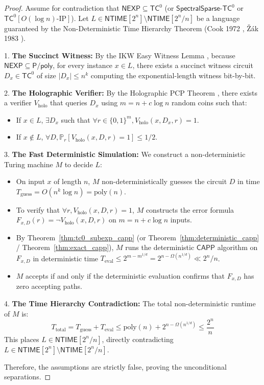 \documentclass[11pt,a4paper]{article}
\theoremstyle{definition}
\theoremstyle{remark}
\newcommand{\Ppoly}{\mathsf{P/poly}}
\newcommand{\NEXP}{\mathsf{NEXP}}
\newcommand{\TC}{\mathsf{TC}}
\newcommand{\NTIME}{\mathsf{NTIME}}
\newcommand{\poly}{\mathrm{poly}}
\newcommand{\CAPP}{\mathsf{CAPP}}
\newcommand{\SparseTC}{\mathsf{SpectralSparse}\text{-}\mathsf{TC}^0}
\begin{document}
\begin{proof}
Assume for contradiction that $\NEXP \subseteq \TC^0$ (or $\SparseTC$ or $\TC^0[O(\log n)\text{-}\mathrm{IP}]$).
Let $L \in \NTIME[2^n] \setminus \NTIME[2^n / n]$ be a language guaranteed by the Non-Deterministic Time Hierarchy Theorem (Cook 1972 \cite{cook72}, Žák 1983 \cite{zak83}).

1. \textbf{The Succinct Witness:} By the IKW Easy Witness Lemma \cite{ikw02}, because $\NEXP \subseteq \Ppoly$, for every instance $x \in L$, there exists a succinct witness circuit $D_x \in \TC^0$ of size $|D_x| \le n^k$ computing the exponential-length witness bit-by-bit.

2. \textbf{The Holographic Verifier:} By the Holographic PCP Theorem \cite{bfls91}, there exists a verifier $V_{\mathrm{holo}}$ that queries $D_x$ using $m = n + c \log n$ random coins such that:
\begin{itemize}
    \item If $x \in L$, $\exists D_x$ such that $\forall r \in \{0,1\}^m, V_{\mathrm{holo}}(x, D_x, r) = 1$.
    \item If $x \notin L$, $\forall D, \mathbb{P}_r[V_{\mathrm{holo}}(x, D, r) = 1] \le 1/2$.
\end{itemize}

3. \textbf{The Fast Deterministic Simulation:} We construct a non-deterministic Turing machine $M$ to decide $L$:
\begin{itemize}
    \item On input $x$ of length $n$, $M$ non-deterministically guesses the circuit $D$ in time $T_{\mathrm{guess}} = O(n^k \log n) = \poly(n)$.
    \item To verify that $\forall r, V_{\mathrm{holo}}(x, D, r) = 1$, $M$ constructs the error formula $F_{x,D}(r) = \neg V_{\mathrm{holo}}(x, D, r)$ on $m = n + c \log n$ inputs.
    \item By Theorem~\ref{thm:tc0_subexp_capp} (or Theorem~\ref{thm:deterministic_capp} / Theorem~\ref{thm:exact_capp}), $M$ runs the deterministic $\CAPP$ algorithm on $F_{x,D}$ in deterministic time $T_{\mathrm{eval}} \le 2^{m - m^{1/d}} = 2^{n - \Omega(n^{1/d})} \ll 2^n / n$.
    \item $M$ accepts if and only if the deterministic evaluation confirms that $F_{x,D}$ has zero accepting paths.
\end{itemize}

4. \textbf{The Time Hierarchy Contradiction:} The total non-deterministic runtime of $M$ is:
\[
T_{\mathrm{total}} = T_{\mathrm{guess}} + T_{\mathrm{eval}} \le \poly(n) + 2^{n - \Omega(n^{1/d})} \le \frac{2^n}{n}
\]
This places $L \in \NTIME[2^n / n]$, directly contradicting $L \in \NTIME[2^n] \setminus \NTIME[2^n / n]$.

Therefore, the assumptions are strictly false, proving the unconditional separations.
\end{proof}
\end{document}
